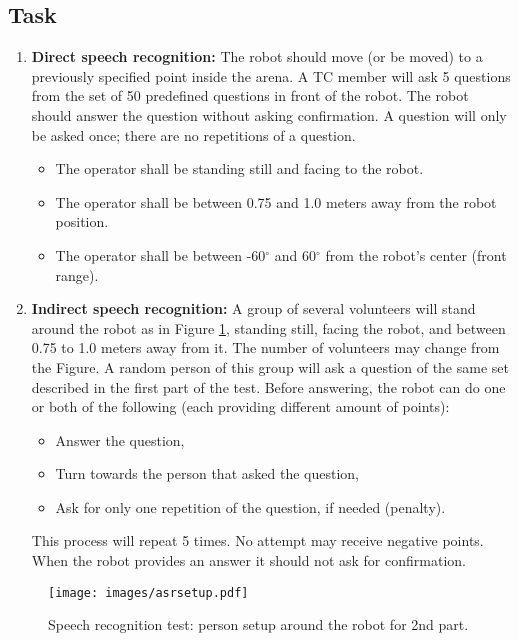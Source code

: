 \subsection{Task}

\begin{enumerate}
\item \textbf{Direct speech recognition: } The robot should move (or be moved) to a previously specified point inside the arena. 
  A TC member will ask 5 questions from the set of 50 predefined questions in front of the robot. 
  The robot should answer the question without asking confirmation.
  A question will only be asked once; there are no repetitions of a question. 
\begin{itemize}
\item The operator shall be standing still and facing to the robot.
\item The operator shall be between 0.75 and 1.0 meters away from the robot position.
\item The operator shall be between -60$^{\circ}$ and 60$^{\circ}$ from the robot's center (front range).
\end{itemize}
\item \textbf{Indirect speech recognition: } A group of several volunteers will stand around the robot as in Figure \ref{fig:asrsetup}, standing still, facing the robot, and between 0.75 to 1.0 meters away from it. The number of volunteers may change from the Figure. A random person of this group will ask a question of the same set described in the first part of the test. Before answering, the robot can do one or both of the following (each providing different amount of points):
\begin{itemize}
\item Answer the question,
\item Turn towards the person that asked the question,
\item Ask for only one repetition of the question, if needed (penalty).
\end{itemize}
This process will repeat 5 times. No attempt may receive negative points. When the robot provides an answer it should not ask for confirmation.
\end{enumerate}

\begin{figure}[!h]
	\centering
	\texttt{[image: images/asrsetup.pdf]}
	\caption{Speech recognition test: person setup around the robot for 2nd part.}
	\label{fig:asrsetup}
\end{figure}



